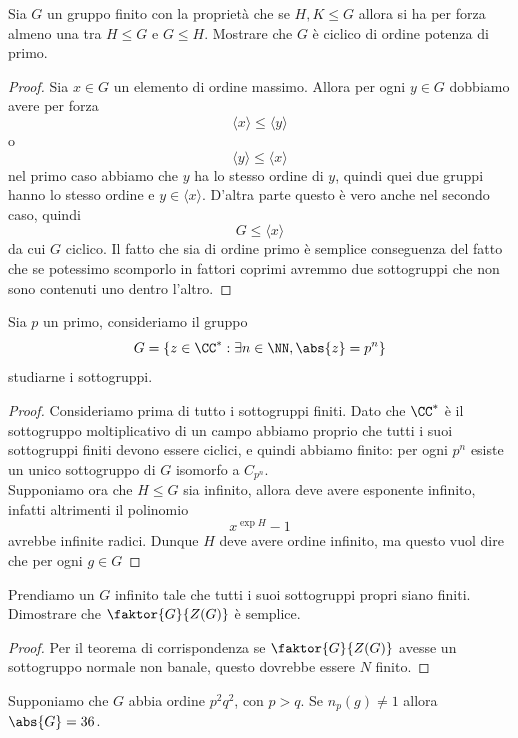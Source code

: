 \documentclass[11pt]{scrartcl}
\begin{document}
	\begin{exercise}
		Sia $G$ un gruppo finito con la proprietà che se $H,K\le G$ allora si ha per forza almeno una tra $H\le G$ e $G\le H$. Mostrare che $G$ è ciclico di ordine potenza di primo.
	\end{exercise}
	\begin{proof}
		Sia $x\in G$ un elemento di ordine massimo. Allora per ogni $y\in G$ dobbiamo avere per forza
		$$\langle x \rangle \le \langle y \rangle$$
		o
		$$\langle y \rangle \le \langle x \rangle$$
		nel primo caso abbiamo che $y$ ha lo stesso ordine di $y$, quindi quei due gruppi hanno lo stesso ordine e $y\in \langle x \rangle$. D'altra parte questo è vero anche nel secondo caso, quindi
		$$G\le \langle x \rangle$$
		da cui $G$ ciclico. Il fatto che sia di ordine primo è semplice conseguenza del fatto che se potessimo scomporlo in fattori coprimi avremmo due sottogruppi che non sono contenuti uno dentro l'altro.
	\end{proof}
	\begin{exercise}
		Sia $p$ un primo, consideriamo il gruppo $$G=\left\{z\in \CC^*:\exists n\in\NN,\abs{z}=p^n\right\}$$
		studiarne i sottogruppi.
	\end{exercise}	
	\begin{proof}
		Consideriamo prima di tutto i sottogruppi finiti. Dato che $\CC^*$ è il sottogruppo moltiplicativo di un campo abbiamo proprio che tutti i suoi sottogruppi finiti devono essere ciclici, e quindi abbiamo finito: per ogni $p^n$ esiste un unico sottogruppo di $G$ isomorfo a $C_{p^n}$. \\
		Supponiamo ora che $H\le G$ sia infinito, allora deve avere esponente infinito, infatti altrimenti il polinomio
		$$x^{\exp H}-1$$
		avrebbe infinite radici. Dunque $H$ deve avere ordine infinito, ma questo vuol dire che per ogni $g\in G$  
	\end{proof}
	\begin{exercise}
		Prendiamo un $G$ infinito tale che tutti i suoi sottogruppi propri siano finiti. Dimostrare che $\faktor{G}{Z(G)}$ è semplice.
	\end{exercise}
	\begin{proof}
		Per il teorema di corrispondenza se $\faktor{G}{Z(G)}$ avesse un sottogruppo normale non banale, questo dovrebbe essere $N$ finito.
	\end{proof}
	\begin{exercise}
		Supponiamo che $G$ abbia ordine $p^2q^2$, con $p>q$. Se $n_p(g)\ne 1$ allora $\abs{G}=36$.
	\end{exercise}
\end{document}
